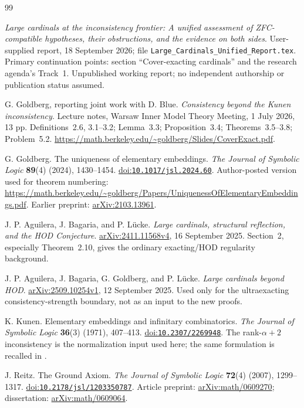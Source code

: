 \documentclass[11pt,letterpaper]{article}
\theoremstyle{definition}
\newcommand{\arxiv}[1]{\href{https://arxiv.org/abs/#1}{arXiv:#1}}
\newcommand{\doi}[1]{\href{https://doi.org/#1}{doi:\nolinkurl{#1}}}
\numberwithin{equation}{section}
\begin{document}
\begin{thebibliography}{99}

\emph{Large cardinals at the inconsistency frontier: A unified assessment of ZFC-compatible hypotheses, their obstructions, and the evidence on both sides}.
User-supplied report, 18 September 2026; file \texttt{Large\_Cardinals\_Unified\_Report.tex}. Primary continuation points: section ``Cover-exacting cardinals'' and the research agenda's Track~1. Unpublished working report; no independent authorship or publication status assumed.

G. Goldberg, reporting joint work with D. Blue.
\emph{Consistency beyond the Kunen inconsistency}.
Lecture notes, Warsaw Inner Model Theory Meeting, 1 July 2026, 13 pp.
Definitions~2.6, 3.1--3.2; Lemma~3.3; Proposition~3.4; Theorems~3.5--3.8; Problem~5.2.
\url{https://math.berkeley.edu/~goldberg/Slides/CoverExact.pdf}.

G. Goldberg.
The uniqueness of elementary embeddings.
\emph{The Journal of Symbolic Logic} \textbf{89}(4) (2024), 1430--1454.
\doi{10.1017/jsl.2024.60}.
Author-posted version used for theorem numbering:
\url{https://math.berkeley.edu/~goldberg/Papers/UniquenessOfElementaryEmbeddings.pdf}.
Earlier preprint: \arxiv{2103.13961}.

J. P. Aguilera, J. Bagaria, and P. L\"ucke.
\emph{Large cardinals, structural reflection, and the HOD Conjecture}.
\arxiv{2411.11568v4}, 16 September 2025.
Section~2, especially Theorem~2.10, gives the ordinary exacting/HOD regularity background.

J. P. Aguilera, J. Bagaria, G. Goldberg, and P. L\"ucke.
\emph{Large cardinals beyond HOD}.
\arxiv{2509.10254v1}, 12 September 2025.
Used only for the ultraexacting consistency-strength boundary, not as an input to the new proofs.

K. Kunen.
Elementary embeddings and infinitary combinatorics.
\emph{The Journal of Symbolic Logic} \textbf{36}(3) (1971), 407--413.
\doi{10.2307/2269948}.
The rank-$\alpha+2$ inconsistency is the normalization input used here; the same formulation is recalled in \cite[Theorem~1.1]{cover}.

J. Reitz.
The Ground Axiom.
\emph{The Journal of Symbolic Logic} \textbf{72}(4) (2007), 1299--1317.
\doi{10.2178/jsl/1203350787}.
Article preprint: \arxiv{math/0609270}; dissertation: \arxiv{math/0609064}.

\end{thebibliography}
\end{document}
